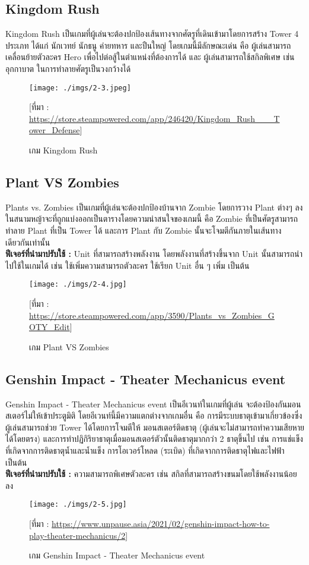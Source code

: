 \documentclass[12pt,oneside,openright,a4paper]{cpe-thai-project}
\begin{document}
\subsection{Kingdom Rush}
Kingdom Rush เป็นเกมที่ผู้เล่นจะต้องปกป้องเส้นทางจากศัตรูที่เดินเข้ามาโดยการสร้าง 
Tower 4 ประเภท ได้แก่ นักเวทย์ นักธนู ค่ายทหาร และปืนใหญ่ โดยเกมนี้มีลักษณะเด่น 
คือ ผู้เล่นสามารถเคลื่อนย้ายตัวละคร Hero เพื่อไปต่อสู้ในตำแหน่งที่ต้องการได้ และ 
ผู้เล่นสามารถใช้สกิลพิเศษ เช่น อุกกาบาต ในการทำลายศัตรูเป็นวงกว้างได้
\begin{figure}[H]\centering
  \texttt{[image: ./imgs/2-3.jpeg]}
  \caption{เกม Kingdom Rush}\label{fig:2-3}
  \small [ที่มา : \url{https://store.steampowered.com/app/246420/Kingdom_Rush___Tower_Defense}]
\end{figure}

\pagebreak
\subsection{Plant VS Zombies}
Plants vs. Zombies เป็นเกมที่ผู้เล่นจะต้องปกป้องบ้านจาก Zombie 
โดยการวาง Plant ต่างๆ ลงในสนามหญ้าจะที่ถูกแบ่งออกเป็นตารางโดยความน่าสนใจของเกมนี้ 
คือ Zombie ที่เป็นศัตรูสามารถทำลาย Plant ที่เป็น Tower ได้ และการ Plant กับ Zombie 
นั้นจะโจมตีกันภายในเส้นทางเดียวกันเท่านั้น\\
\textbf{ฟีเจอร์ที่นำมาปรับใช้ : } Unit ที่สามารถสร้างพลังงาน โดยพลังงานที่สร้างขึ้นจาก 
Unit นั้นสามารถนำไปใช้ในเกมได้ เช่น ใช้เพิ่มความสามารถตัวละคร  
ใช้เรียก Unit อื่น ๆ เพิ่ม เป็นต้น
\begin{figure}[H]\centering
  \texttt{[image: ./imgs/2-4.jpg]}
  \caption{เกม Plant VS Zombies}\label{fig:2-4}
  \small [ที่มา : \url{https://store.steampowered.com/app/3590/Plants_vs_Zombies_GOTY_Edit}]
\end{figure}

\subsection{Genshin Impact - Theater Mechanicus event}
Genshin Impact - Theater Mechanicus event เป็นอีเวนท์ในเกมที่ผู้เล่น
จะต้องป้องกันมอนสเตอร์ไม่ให้เข้าประตูมิติ โดยอีเวนท์นี้มีความแตกต่างจากเกมอื่น 
คือ การมีระบบธาตุเข้ามาเกี่ยวข้องซึ่งผู้เล่นสามารถช่วย Tower ได้โดยการโจมตีให้
มอนสเตอร์ติดธาตุ (ผู้เล่นจะไม่สามารถทำความเสียหายได้โดยตรง) 
และการทำปฏิกิริยาธาตุเมื่อมอนสเตอร์ตัวนั้นติดธาตุมากกว่า 2 ธาตุขึ้นไป เช่น 
การแช่แข็งที่เกิดจากการติดธาตุน้ำและน้ำแข็ง การโอเวอร์โหลด (ระเบิด) ที่เกิดจากการติดธาตุไฟและไฟฟ้า เป็นต้น\\
\textbf{ฟีเจอร์ที่นำมาปรับใช้ : } ความสามารถพิเศษตัวละคร เช่น สกิลที่สามารถสร้างขนมโดยใช้พลังงานน้อยลง
\begin{figure}[H]\centering
  \texttt{[image: ./imgs/2-5.jpg]}
  \caption{เกม Genshin Impact - Theater Mechanicus event}\label{fig:2-5}
  \small [ที่มา : \url{https://www.unpause.asia/2021/02/genshin-impact-how-to-play-theater-mechanicus/2}]
\end{figure}
\end{document}
